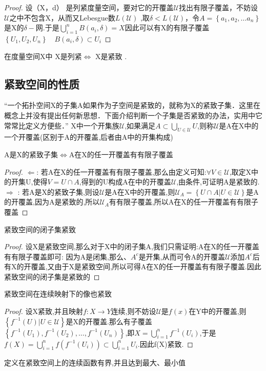     \begin{proof}
        设（X，d） 是列紧度量空间，要对它的开覆盖\(\mathscr{U}\)找出有限子覆盖，不妨设\(\mathscr{U}\)之中不包含X，从而又Lebesgue数\(L(\mathscr{U})\) ,取\(\delta < L(\mathscr{U}) \)，令\(A = \left\{ a_1 ,a_2 ,\dots a_n \right\} \)是X的\(\delta-\text{网}\).于是\(\bigcup_{i=1}^n B(a_i, \delta )=X \)因此可以有X的有限子覆盖\(\left\{ U_1 ,U_2 , U_n\right\} \quad B(a_i, \delta ) \subset U_i \)
    \end{proof}
    \begin{theorem}
        在度量空间X中 X是列紧\(\Leftrightarrow \) X是紧致 .
    \end{theorem}
    \subsection*{紧致空间的性质}
    “一个拓扑空间X的子集A如果作为子空间是紧致的，就称为X的紧致子集．这里在概念上并没有提出任何新思想．下面介绍判断一个子集是否紧致的办法，实用中它常常比定义方便些．” X中一个开集族\(\mathscr{U}\),如果满足\(A \subset \bigcup_{U \in \mathscr{U}}U \),则称\(\mathscr{U}\)是A在X中的一个开覆盖(区别于A的开覆盖,后者由A中的开集构成)
    \begin{corollary}
        A是X的紧致子集\(\Leftrightarrow\)A在X的任一开覆盖有有限子覆盖
    \end{corollary}
    \begin{proof}
        \(\Leftarrow\): 若A在X的任一开覆盖有有限子覆盖,那么由定义可知:\(\forall V \in \mathscr{U} \),取定X中的开集U,使得\(V = U \cap A\),得到的U构成A在中的开覆盖\(\mathscr{U}\),由条件,可证明A是紧致的.
        \\
        \(\Rightarrow\) : 若A是X的紧致子集,则设\(\mathscr{U}\)是A在X中的开覆盖,则\(\mathscr{U}_A = \left\{U \cap A | U \in \mathscr{U} \right\}\)是A的开覆盖,因为A是紧致的,所以\(\mathscr{U}_A\)有有限子覆盖,所以A在X的任一开覆盖有有限子覆盖
    \end{proof}
    \begin{corollary}
        紧致空间的闭子集紧致
    \end{corollary}
    \begin{proof}
        设X是紧致空间,那么对于X中的闭子集A,我们只需证明:A在X的任一开覆盖有有限子覆盖即可: 因为A是闭集,那么、\(A^{c}\)是开集,从而可令A的开覆盖\(\mathscr{U}\)添加\(A^{c}\)后有X的开覆盖,又由于X是紧致空间,所以可得A在X的任一开覆盖有有限子覆盖.因此紧致空间的闭子集是紧致的
    \end{proof}
    \begin{corollary}
        紧致空间在连续映射下的像也紧致
    \end{corollary}
    \begin{proof}
        设X紧致,并且映射\(f: X \rightarrow Y \)连续,则不妨设\(\mathscr{U}\)是\(f(x)\)在Y中的开覆盖,则\(\left\{ f^{-1}(U) | U \in \mathscr{U}\right\}\)是X的开覆盖.那么有子覆盖\(\left\{f^{-1}(U_1),f^{-1}(U_2),\dots , f^{-1}(U_n)\right\}\),即\(X = \bigcup_{i=1}^n f^{-1}(U_i)\),于是\(f(X)=\bigcup_{i=1}^{n}f(f^{-1}(U_i)) \subset \bigcup_{i=1}^n U_i\).因此f(X)紧致.
    \end{proof}
    \begin{lemma}
        定义在紧致空间上的连续函数有界,并且达到最大、最小值
    \end{lemma}
